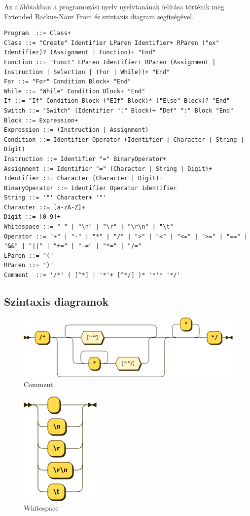 Az alábbiakban a programozási nyelv nyelvtanának felírása történik meg Extended Backus-Naur From és szintaxis diagram segítségével.

\begin{verbatim}
Program  ::= Class+
Class ::= "Create" Identifier LParen Identifier+ RParen ("ex" Identifier)? (Assignment | Function)+ "End"
Function ::= "Funct" LParen Identifier+ RParen (Assignment | Instruction | Selection | (For | While))+ "End"
For ::= "For" Condition Block+ "End"
While ::= "While" Condition Block+ "End"
If ::= "If" Condition Block ("EIf" Block)* ("Else" Block)? "End"
Switch ::= "Switch" (Identifier ":" Block)+ "Def" ":" Block "End"
Block ::= Expression+
Expression ::= (Instruction | Assignment)
Condition ::= Identifier Operator (Identifier | Character | String | Digit)
Instruction ::= Identifier "=" BinaryOperator+
Assignment ::= Identifier "=" (Character | String | Digit)+
Identifier ::= Character (Character | Digit)+
BinaryOperator ::= Identifier Operator Identifier
String ::= '"' Character+ '"'
Character ::= [a-zA-Z]+
Digit ::= [0-9]+
Whitespace ::= " " | "\n" | "\r" | "\r\n" | "\t"
Operator ::= "+" | "-" | "*" | "/" | ">" | "<" | "<=" | ">=" | "==" | "&&" | "||" | "+=" | "-=" | "*=" | "/="
LParen ::= "("
RParen ::= ")"
Comment  ::= '/*' ( [^*] | '*'+ [^*/] )* '*'* '*/'

\end{verbatim}

\subsection{Szintaxis diagramok}

\begin{figure}[h!]
\centering
\includegraphics[scale=0.5]{kepek/rr_comment.png}
\caption{Comment}
\label{fig:rr_comment}
\end{figure}

\begin{figure}[h!]
\centering
\includegraphics[scale=0.5]{kepek/rr_whitespace.png}
\caption{Whitespace}
\label{fig:rr_whitespace}
\end{figure}

